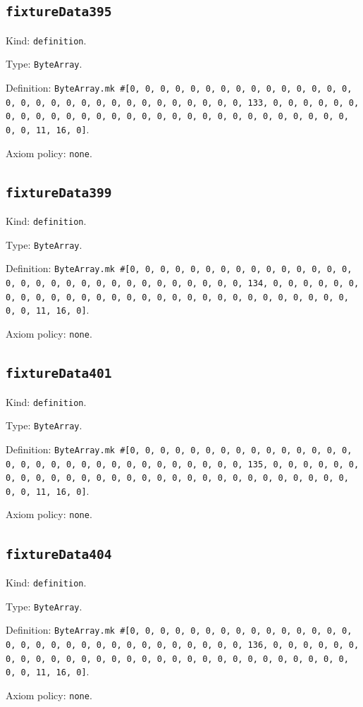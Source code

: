 \documentclass[11pt]{article}
\begin{document}
\subsection*{\texttt{fixtureData395}}
\noindent Kind: \texttt{definition}.\par
\noindent Type: \texttt{ByteArray}.\par
\noindent Definition: \texttt{ByteArray.mk \#[0, 0, 0, 0, 0, 0, 0, 0, 0, 0, 0, 0, 0, 0, 0, 0, 0, 0, 0, 0, 0, 0, 0, 0, 0, 0, 0, 0, 0, 0, 0, 133, 0, 0, 0, 0, 0, 0, 0, 0, 0, 0, 0, 0, 0, 0, 0, 0, 0, 0, 0, 0, 0, 0, 0, 0, 0, 0, 0, 0, 0, 0, 0, 11, 16, 0]}.\par
\noindent Axiom policy: \texttt{none}.\par
\subsection*{\texttt{fixtureData399}}
\noindent Kind: \texttt{definition}.\par
\noindent Type: \texttt{ByteArray}.\par
\noindent Definition: \texttt{ByteArray.mk \#[0, 0, 0, 0, 0, 0, 0, 0, 0, 0, 0, 0, 0, 0, 0, 0, 0, 0, 0, 0, 0, 0, 0, 0, 0, 0, 0, 0, 0, 0, 0, 134, 0, 0, 0, 0, 0, 0, 0, 0, 0, 0, 0, 0, 0, 0, 0, 0, 0, 0, 0, 0, 0, 0, 0, 0, 0, 0, 0, 0, 0, 0, 0, 11, 16, 0]}.\par
\noindent Axiom policy: \texttt{none}.\par
\subsection*{\texttt{fixtureData401}}
\noindent Kind: \texttt{definition}.\par
\noindent Type: \texttt{ByteArray}.\par
\noindent Definition: \texttt{ByteArray.mk \#[0, 0, 0, 0, 0, 0, 0, 0, 0, 0, 0, 0, 0, 0, 0, 0, 0, 0, 0, 0, 0, 0, 0, 0, 0, 0, 0, 0, 0, 0, 0, 135, 0, 0, 0, 0, 0, 0, 0, 0, 0, 0, 0, 0, 0, 0, 0, 0, 0, 0, 0, 0, 0, 0, 0, 0, 0, 0, 0, 0, 0, 0, 0, 11, 16, 0]}.\par
\noindent Axiom policy: \texttt{none}.\par
\subsection*{\texttt{fixtureData404}}
\noindent Kind: \texttt{definition}.\par
\noindent Type: \texttt{ByteArray}.\par
\noindent Definition: \texttt{ByteArray.mk \#[0, 0, 0, 0, 0, 0, 0, 0, 0, 0, 0, 0, 0, 0, 0, 0, 0, 0, 0, 0, 0, 0, 0, 0, 0, 0, 0, 0, 0, 0, 0, 136, 0, 0, 0, 0, 0, 0, 0, 0, 0, 0, 0, 0, 0, 0, 0, 0, 0, 0, 0, 0, 0, 0, 0, 0, 0, 0, 0, 0, 0, 0, 0, 11, 16, 0]}.\par
\noindent Axiom policy: \texttt{none}.\par
\end{document}
